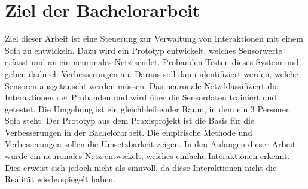 \section{Ziel der Bachelorarbeit}
\label{sec:goal}
Ziel dieser Arbeit ist eine Steuerung zur Verwaltung von Interaktionen mit einem Sofa zu entwickeln. Dazu wird ein Prototyp entwickelt, welches Sensorwerte erfasst und an ein neuronales Netz sendet. Probanden Testen dieses System und geben dadurch Verbesserungen an. Daraus soll dann identifiziert werden, welche Sensoren ausgetauscht werden müssen. 
\newpage
Das neuronale Netz klassifiziert die Interaktionen der Probanden und wird über die Sensordaten trainiert und getestet. Die Umgebung ist ein gleichbleibender Raum, in dem ein 3 Personen Sofa steht. Der Prototyp aus dem Praxisprojekt ist die Basis für die Verbesserungen in der Bachelorarbeit. Die empirische Methode und Verbesserungen sollen die Umsetzbarkeit zeigen.
\newline
\newline
In den Anfängen dieser Arbeit wurde ein neuronales Netz entwickelt, welches einfache Interaktionen erkennt. Dies erweist sich jedoch nicht als sinnvoll, da diese Interaktionen nicht die Realität wiederspiegelt haben.